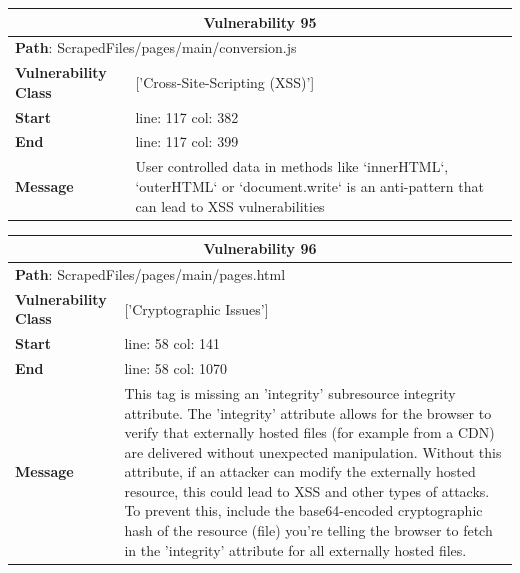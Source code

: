 \documentclass[12pt]{article}
\begin{document}
\vspace{0.7cm}
\FloatBarrier
\begin{table}[!h]
\centering
\renewcommand{\arraystretch}{1.3}
\begin{tabular}{|l|p{10cm}|}
\hline
\multicolumn{2}{|c|}{\textbf{Vulnerability 95}} \\
\hline
\multicolumn{2}{|l|}{\textbf{Path}: ScrapedFiles/pages/main/conversion.js} \\
\hline
\textbf{Vulnerability Class} & ['Cross-Site-Scripting (XSS)'] \\
\hline
\textbf{Start} & line: 117 \quad col: 382 \\
\hline
\textbf{End} & line: 117 \quad col: 399 \\
\hline
\textbf{Message} & User controlled data in methods like `innerHTML`, `outerHTML` or `document.write` is an anti-pattern that can lead to XSS vulnerabilities \\
\hline
\end{tabular}
\end{table}
\vspace{0.7cm}
\FloatBarrier
\begin{table}[!h]
\centering
\renewcommand{\arraystretch}{1.3}
\begin{tabular}{|l|p{10cm}|}
\hline
\multicolumn{2}{|c|}{\textbf{Vulnerability 96}} \\
\hline
\multicolumn{2}{|l|}{\textbf{Path}: ScrapedFiles/pages/main/pages.html} \\
\hline
\textbf{Vulnerability Class} & ['Cryptographic Issues'] \\
\hline
\textbf{Start} & line: 58 \quad col: 141 \\
\hline
\textbf{End} & line: 58 \quad col: 1070 \\
\hline
\textbf{Message} & This tag is missing an 'integrity' subresource integrity attribute. The 'integrity' attribute allows for the browser to verify that externally hosted files (for example from a CDN) are delivered without unexpected manipulation. Without this attribute, if an attacker can modify the externally hosted resource, this could lead to XSS and other types of attacks. To prevent this, include the base64-encoded cryptographic hash of the resource (file) you're telling the browser to fetch in the 'integrity' attribute for all externally hosted files. \\
\hline
\end{tabular}
\end{table}
\vspace{0.7cm}
\end{document}

